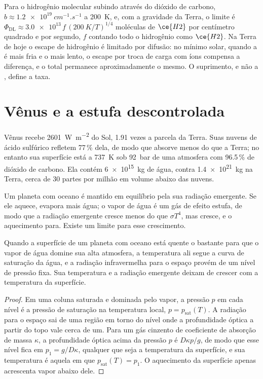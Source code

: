 Para o hidrogênio molecular subindo através do dióxido de carbono, $b \approx
\qty{1.2e19}{cm^{-1}.s^{-1}}$ a \qty{200}{K}, e, com a gravidade da Terra,
o limite é $\Phi_\mathrm{DL} \approx
\num{3.0e13}\,f\,(\qty{200}{K}/T)^{1/4}$ moléculas de $\ce{H2}$ por
centímetro quadrado e por segundo, $f$ contando todo o hidrogênio como $\ce{H2}$. Na
Terra de hoje o escape de hidrogênio é limitado por difusão: no mínimo solar,
quando a  é mais fria e o  mais lento, o escape por troca
de carga com íons compensa a diferença, e o total permanece aproximadamente
o mesmo. O suprimento, e não a
, define a taxa.

\section{Vênus e a estufa descontrolada}\label{sec:b3:planetary-atmospheres:venus}

Vênus recebe \qty{2601}{W.m^{-2}} do Sol, 1.91 vezes a parcela da Terra.
Suas nuvens de ácido sulfúrico refletem 77\,\% dela, de modo que absorve
menos do que a Terra; no entanto sua superfície está a \qty{737}{K} sob \qty{92}{bar}
de uma atmosfera com 96.5\,\% de dióxido de carbono. Ela contém \qty{6e15}{kg} de água,
contra \qty{1.4e21}{kg} na Terra, cerca de 30 partes por milhão em
volume abaixo das nuvens.

Um planeta com oceano é mantido em equilíbrio pela sua radiação emergente. Se
ele aquece, evapora mais água; o vapor de água é um gás de efeito estufa, de modo que a
radiação emergente cresce menos do que $\sigma T^4$, mas cresce, e o
aquecimento para. Existe um limite para esse crescimento.

\begin{proposition}\label{prop:b3:planetary-atmospheres:limit}
Quando a superfície de um planeta com oceano está quente o bastante para que o vapor de água
domine sua alta atmosfera, a temperatura ali segue a
curva de saturação da água, e a radiação infravermelha para o espaço provém de
um nível de pressão fixa. Sua temperatura e a radiação emergente
deixam de crescer com a temperatura da superfície.
\end{proposition}

\begin{proof}
Em uma coluna saturada e dominada pelo vapor, a pressão $p$ em cada
nível é a pressão de saturação na temperatura local, $p =
p_\mathrm{sat}(T)$. A radiação para o espaço sai de uma região em torno do nível
onde a profundidade óptica a partir do topo vale cerca de um. Para um gás cinzento de
coeficiente de absorção de massa $\kappa$, a profundidade óptica acima da pressão $p$
é $D\kappa p/g$, de modo que esse nível fica em $p_1 = g/D\kappa$, qualquer que seja a
temperatura da superfície, e sua temperatura é aquela em que
$p_\mathrm{sat}(T) = p_1$. O aquecimento da superfície apenas acrescenta vapor abaixo dele.
\end{proof}

